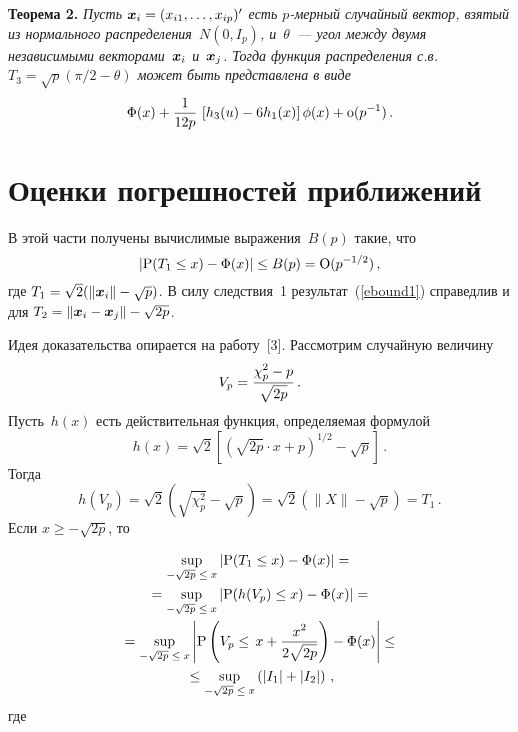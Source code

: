 \begin{multicols}{2}
\noindent
\textbf{Теорема 2.} %
\textit{Пусть $\mbox{\boldmath{$x$}}_i = (x_{i1}, \ldots, x_{ip})^\prime$ есть $p$-мер\-ный случайный вектор, 
взятый из нормального распределения~$N(0,I_p)$, и~$\theta$~--- угол между двумя независимыми 
векторами~$\mbox{\boldmath{$x$}}_i$ и~$\mbox{\boldmath{$x$}}_j$.
Тогда функция распределения с.в.\  $T_3 = \sqrt{p}\left(\pi/2 - \theta\right)$ может быть представлена в виде}
\begin{equation*}
\mbox{$\Phi$}(x) +\displaystyle\frac{\displaystyle 1\mathstrut}{\displaystyle 12p\mathstrut}\,
       \left[h_3(u) - 6h_1(x)\right]\mbox{$\phi$}(x) + \mbox{\rm o}(p^{-1})\,.
\end{equation*}


\section{Оценки погрешностей приближений}

В этой части   получены вычислимые выражения~$B(p)$ такие, что
\begin{equation}
| \mbox{\rm P}(T_1 \le x) - \mbox{$\Phi$}(x) | \le  B(p) = \mbox{\rm O}(p^{-1/2})\,,
\label{ebound1}
\end{equation}
где $T_1 = \sqrt 2(\|\mbox{\boldmath{$x$}}_i\| -\sqrt{p})$. В силу следствия~1 результат~(\ref{ebound1}) 
справедлив и для $T_2 =\| \mbox{\boldmath{$x$}}_i - \mbox{\boldmath{$x$}}_j \| -\sqrt{2p}$.

Идея доказательства опирается на работу~[3]. Рассмотрим случайную величину
\begin{equation*}
 V_p = \displaystyle\frac{\displaystyle \chi_p^2 - p\mathstrut}{\displaystyle \sqrt{2p}\mathstrut}\,.
\end{equation*}
Пусть~$h(x)$ есть действительная функция, определяемая формулой
$$
h(x) = \sqrt{2}\left[\left(\sqrt{2p}\cdot x + p \right)^{{1}/{2}} - \sqrt{p}\right]\,.
$$
Тогда
\begin{equation*}
 h(V_p)=\sqrt{2}\left(\sqrt{\chi_p^2}- \sqrt{p}\right)
       =\sqrt{2}\left(\|X\|- \sqrt{p}\right)
       =T_1\,.
\end{equation*}
Если   $x \ge -\sqrt{2p}$,    то

\vspace*{-1pt}

\noindent
\begin{multline*}
\sup\limits_{-\sqrt{2p}\; \le\; x} \left |\mbox{\rm P}(T_1 \le x) - \mbox{$\Phi$}(x) \right|={}\\
{}  =\sup\limits_{-\sqrt{2p}\; \le\; x} \left| \mbox{\rm P}(h(V_p) \le x) - \mbox{$\Phi$}(x)\right| ={}\\
{}=\sup\limits_{-\sqrt{2p} \;\le\;
 x} \left| \mbox{\rm P}\left(V_p \le\, x + \displaystyle\frac{\displaystyle x^2\mathstrut}{\displaystyle 2\sqrt{2p}\mathstrut}\right) - \mbox{$\Phi$}(x)\right|\leq{}\\
{} \leq\sup\limits_{-\sqrt{2p}\; \le\; x} \left(\left|I_1\right| +\left|I_2 \right|\right)\,,
\end{multline*}
где
\vspace*{-4pt}


\end{multicols}
